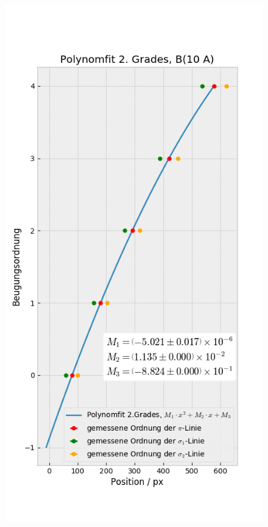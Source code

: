       \begin{myframe}{}
          \begin{figure}
              \centering
              \includegraphics[height=.85\paperheight]{img/sco_10A}

\end{figure}
\end{myframe}
